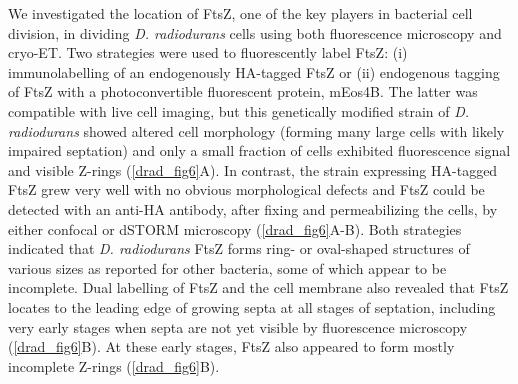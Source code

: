 We investigated the location of FtsZ, one of the key players in bacterial cell division, in dividing \textit{D. radiodurans} cells using both fluorescence microscopy and cryo-ET.
Two strategies were used to fluorescently label FtsZ: (i) immunolabelling of an endogenously HA-tagged FtsZ or (ii) endogenous tagging of FtsZ with a photoconvertible fluorescent protein, mEos4B.
The latter was compatible with live cell imaging, but this genetically modified strain of \textit{D. radiodurans} showed altered cell morphology (forming many large cells with likely impaired septation) and only a small fraction of cells exhibited fluorescence signal and visible Z-rings (\autoref{drad_fig6}A).
In contrast, the strain expressing HA-tagged FtsZ grew very well with no obvious morphological defects and FtsZ could be detected with an anti-HA antibody, after fixing and permeabilizing the cells, by either confocal or dSTORM microscopy (\autoref{drad_fig6}A-B).
Both strategies indicated that \textit{D. radiodurans} FtsZ forms ring- or oval-shaped structures of various sizes as reported for other bacteria, some of which appear to be incomplete.
Dual labelling of FtsZ and the cell membrane also revealed that FtsZ locates to the leading edge of growing septa at all stages of septation, including very early stages when septa are not yet visible by fluorescence microscopy (\autoref{drad_fig6}B).
At these early stages, FtsZ also appeared to form mostly incomplete Z-rings (\autoref{drad_fig6}B).

